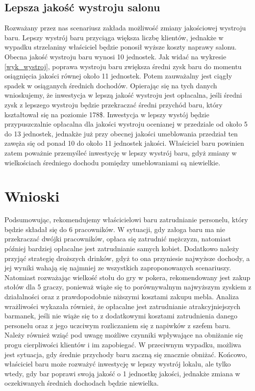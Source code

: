 \documentclass[12pt, a4paper, oneside]{mwart} %
\begin{document}
\subsection{Lepsza jakość wystroju salonu}
Rozważany przez nas scenariusz zakłada możliwość zmiany jakościowej wystroju baru. Lepszy wystrój baru przyciąga większa liczbę klientów, jednakże w wypadku strzelaniny właściciel będzie ponosił wyższe koszty naprawy salonu. Obecna jakość wystroju baru wynosi 10 jednostek. Jak widać na wykresie \ref{wyk_wystroj}, poprawa wystroju baru zwiększa średni zysk baru do momentu osiągnięcia jakości równej około 11 jednostek. Potem zauważalny jest ciągły spadek w osiąganych średnich dochodów. Opierając się na tych danych wnioskujemy, że inwestycja w lepszą jakość wystroju jest opłacalna, jeśli średni zysk z lepszego wystroju będzie przekraczać średni przychód baru, który kształtował się na poziomie 178\$. Inwestycja w lepszy wystój będzie przypuszczalnie opłacalna dla jakości wystroju ocenianej w przedziale od około 5 do 13 jednostek, jednakże już przy obecnej jakości umeblowania przedział ten zawęża się od ponad 10 do około 11 jednostek jakości. Właściciel baru powinien zatem poważnie przemyśleć inwestycję w lepszy wystrój baru, gdyż zmiany w wielkościach średniego dochodu pomiędzy umeblowaniami są niewielkie.

\section{Wnioski}
Podsumowując, rekomendujemy właścicielowi baru zatrudnianie personelu, który będzie składał się do 6 pracowników. W sytuacji, gdy załoga baru ma nie przekraczać dwójki pracowników, opłaca się zatrudnić mężczyzn, natomiast później bardziej opłacalne jest zatrudnianie samych kobiet. Dodatkowo należy przyjąć strategię droższych drinków, gdyż to ona przyniesie najwyższe dochody, a jej wyniki wahają się najmniej ze wszystkich zaproponowanych scenariuszy. Natomiast rozważając wielkość stołu do gry w pokera, rekomendowany jest zakup stołów dla 5 graczy, ponieważ wiąże się  to porównywalnym najwyższym zyskiem z działalności oraz  z prawdopodobnie niższymi kosztami zakupu mebla. Analiza wrażliwości wykazała również, że opłacalne jest zatrudnianie atrakcyjniejszych barmanek, jeśli nie wiąże się to z dodatkowymi kosztami zatrudnienia danego personelu oraz z jego uczciwym rozliczaniem się z napiwków z szefem baru. Należy również wziąć pod uwagę możliwe czynniki wpływające na obniżanie się progu cierpliwości klientów i im zapobiegać. W przeciwnym wypadku, możliwa jest sytuacja, gdy średnie przychody baru zaczną się znacznie obniżać. Końcowo, właściciel baru może rozważyć inwestycję w lepszy wystrój lokalu, ale tylko wtedy, gdy bar poprawi swoją jakość o 1 jednostkę jakości, jednakże zmiana w oczekiwanych średnich dochodach będzie niewielka.
\end{document}

